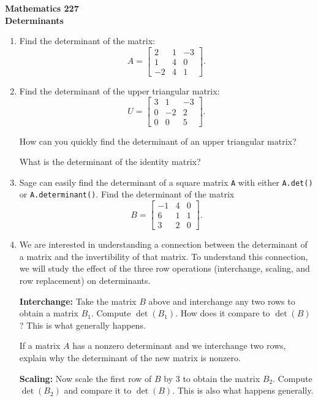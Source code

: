 \documentclass[12pt]{article}
\newcommand{\vs}[1]{\vspace{#1in}}
\begin{document}
\noindent
{\bf Mathematics 227} \\ 
{\bf Determinants}

\bigskip
\begin{enumerate}
\item  Find the determinant of the matrix:
$$
A =
\left[
  \begin{array}{ccc}
    2 & 1 & -3\\
    1 & 4 & 0 \\
    -2& 4 & 1
  \end{array}
\right].
$$


\vs{1.5}
\item Find the determinant of the upper triangular matrix:
$$
U = \left[
  \begin{array}{ccc}
    3 & 1 & -3\\
    0 & -2 & 2 \\
    0& 0 & 5
  \end{array}
\right].
$$

\vs{1.5}
How can you quickly find the determinant of an upper triangular matrix?

\vs{1}
What is the determinant of the identity matrix?

\vs{1}
\newpage
\item Sage can easily find the determinant of a square matrix {\tt A}
  with either {\tt A.det()} or {\tt A.determinant()}. 
  Find the determinant of the matrix
  $$
  B = \left[
    \begin{array}{ccc}
      -1 & 4 & 0\\
      6 & 1 & 1 \\
      3 & 2 & 0 
    \end{array}
  \right].
  $$

  \vs{1}
\item We are interested in understanding a connection between the
  determinant of a matrix and the invertibility of that matrix.  To
  understand this connection, we will study the effect of the three
  row operations (interchange, 
  scaling, and row replacement) on determinants.  

  {\bf Interchange:} Take the matrix $B$
  above and interchange any two rows to obtain a matrix $B_1$.
  Compute $\det(B_1)$. How does it compare to $\det(B)$?  This is what 
  generally happens.

  \vs{1}
  If a matrix $A$ has a nonzero determinant and we interchange two
  rows, explain why the determinant of the new matrix is nonzero.

  \vs{1} {\bf Scaling:} Now scale the first row of $B$ by $3$ to
  obtain the matrix $B_2$.  Compute $\det(B_2)$ and compare it to
  $\det(B)$.  This is also what happens generally.


\end{enumerate}
\end{document}

